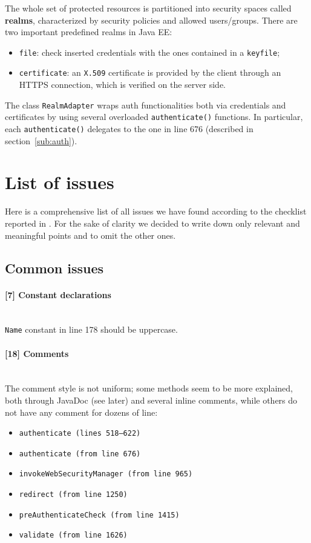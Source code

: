 \documentclass[a4paper, 11pt]{article}
\newcommand{\code}[1]{\texttt{#1}}
\newcommand{\issue}[3][?]{
    \paragraph{[#1] #2} \mbox{}\\ #3
}
\begin{document}
The whole set of protected resources is partitioned into security spaces called \textbf{realms}, characterized by security policies and allowed users/groups. There are two important predefined realms in Java EE:
\begin{itemize}
    \item \code{file}: check inserted credentials with the ones contained in a \code{keyfile};
    \item \code{certificate}: an \code{X.509} certificate is provided by the client through an HTTPS connection, which is verified on the server side.
\end{itemize}

The class \code{RealmAdapter} wraps auth functionalities both via credentials and certificates by using several overloaded \code{authenticate()} functions. In particular, each \code{authenticate()} delegates to the one in line 676 (described in section~\ref{sub:auth}).


\section{List of issues}

Here is a comprehensive list of all issues we have found according to the
checklist reported in \cite{bib:something}.
For the sake of clarity we decided to write down only relevant and 
meaningful points and to omit the other ones.

\subsection{Common issues} %
\issue[7]{Constant declarations}{
    \code{Name} constant in line 178 should be uppercase.
}

\issue[18]{Comments} {
The comment style is not uniform; some methods seem to be more explained, 
both through JavaDoc (see later) and several inline comments, while others 
do not have any comment for dozens of line:
\begin{itemize}
\item \code{authenticate (lines 518--622)} 
\item \code{authenticate (from line 676)} 
\item \code{invokeWebSecurityManager (from line 965)} 
\item \code{redirect (from line 1250)} 
\item \code{preAuthenticateCheck (from line 1415)} 
\item \code{validate (from line 1626)} 
\end{itemize}
}
\end{document}
